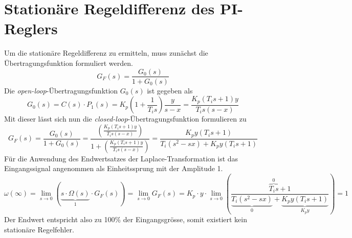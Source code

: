 \section{Stationäre Regeldifferenz des PI-Reglers}
Um die stationäre Regeldifferenz zu ermitteln, muss zunächst die
Übertragungsfunktion formuliert werden.
\[
	G_F(s) = \frac{G_0(s)}{1+G_0(s)}
\]
Die \emph{open-loop}-Übertragungsfunktion $G_0(s)$ ist gegeben als
\[
	G_0(s)
	= C(s) \cdot P_1(s)
	= K_p \left( 1 + \frac{1}{T_i s} \right) \frac{y}{s-x}
	= \frac{K_p(T_i s + 1) y}{T_i s (s-x)}
\]
Mit dieser lässt sich nun die \emph{closed-loop}-Übertragungsfunktion
formulieren zu
\[
	G_F(s)
	= \frac{G_0(s)}{1 + G_0(s)}
	= \frac{
		\left( \frac{K_p(T_i s + 1) y}{T_i s (s-x)} \right)
	}{
		1 + \left( \frac{K_p(T_i s + 1) y}{T_i s (s-x)} \right)
	}
	= \frac{
		K_p y (T_i s + 1)
	}{
		T_i(s^2 - sx) + K_p y (T_i s + 1)
	}
\]
Für die Anwendung des Endwertsatzes der Laplace-Transformation ist das
Eingangssignal angenommen als Einheitssprung mit der Amplitude 1.
\[
	\omega(\infty)
	= \lim_{s \rightarrow 0} \left(
		\underbrace{s \cdot \Omega(s)}_{1} \cdot G_F(s)
	\right)
	= \lim_{s \rightarrow 0} G_F(s)
	= K_p \cdot y \cdot \lim_{s \rightarrow 0} \left(
		\frac{
			\overbrace{T_i s}^{0} + 1
		}{
			\underbrace{T_i(s^2 - sx)}_{0} 
			+ \underbrace{K_p y (T_i s + 1)}_{K_p y}
		}
	\right)
	= 1
\]
Der Endwert entspricht also zu 100\% der Eingangsgrösse, somit existiert
kein stationäre Regelfehler.
